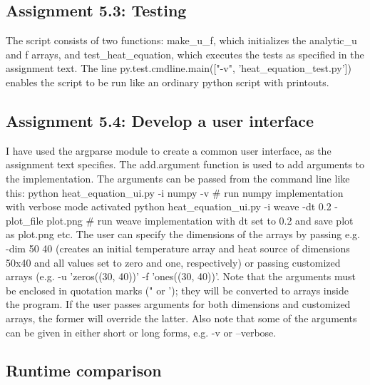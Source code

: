 \documentclass[a4paper]{article}
\begin{document}
\subsection*{Assignment 5.3:  Testing}

The script consists of two functions: make\_u\_f, which initializes the analytic\_u and f arrays, and test\_heat\_equation, which executes the tests as specified in the assignment text. The line py.test.cmdline.main(["-v", 'heat\_equation\_test.py']) enables the script to be run like an ordinary python script with printouts.

\subsection*{Assignment 5.4: Develop a user interface}
I have used the argparse module to create a common user interface, as the assignment text specifies. The add.argument function is used to add arguments to the implementation. The arguments can be passed from the command line like this:\newline
python heat\_equation\_ui.py -i numpy -v \# run numpy implementation with verbose mode activated\newline
python heat\_equation\_ui.py -i weave -dt 0.2 -plot\_file plot.png \# run weave implementation with dt set to 0.2 and save plot as plot.png\newline
etc.\newline\newline
The user can specify the dimensions of the arrays by passing e.g. -dim 50 40 (creates an initial temperature array and heat source of dimensions 50x40 and all values set to zero and one, respectively) or passing customized arrays (e.g. -u 'zeros((30, 40))' -f 'ones((30, 40))'. Note that the arguments must be enclosed in quotation marks (" or '); they will be converted to arrays inside the program. If the user passes arguments for both dimensions and customized arrays, the former will override the latter. Also note that some of the arguments can be given in either short or long forms, e.g. -v or --verbose.


\subsection*{Runtime comparison}
\end{document}
